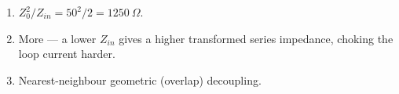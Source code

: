 \begin{enumerate}[leftmargin=1.6em,itemsep=2pt]
\item $Z_0^2/Z_{in} = 50^2/2 = 1250\ \Omega$.
\item More --- a lower $Z_{in}$ gives a higher transformed series impedance, choking the loop current harder.
\item Nearest-neighbour geometric (overlap) decoupling.
\end{enumerate}
